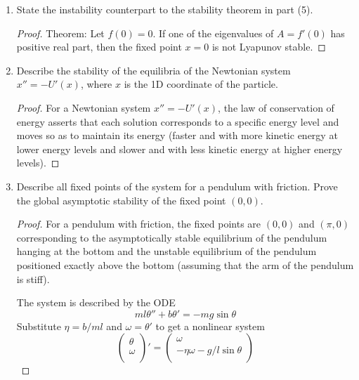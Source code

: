 \documentclass[../psets.tex]{subfiles}
\begin{document}
\begin{enumerate}
\begin{proof}
\begin{proof}
        \end{proof}
    \end{proof}
    \item State the instability counterpart to the stability theorem in part (5).
    \begin{proof}
        Theorem: Let $f(0)=0$. If one of the eigenvalues of $A=f'(0)$ has positive real part, then the fixed point $x=0$ is not Lyapunov stable.
    \end{proof}
    \item Describe the stability of the equilibria of the Newtonian system $x''=-U'(x)$, where $x$ is the 1D coordinate of the particle.
    \begin{proof}
        For a Newtonian system $x''=-U'(x)$, the law of conservation of energy asserts that each solution corresponds to a specific energy level and moves so as to maintain its energy (faster and with more kinetic energy at lower energy levels and slower and with less kinetic energy at higher energy levels).
    \end{proof}
    \item Describe all fixed points of the system for a pendulum with friction. Prove the global asymptotic stability of the fixed point $(0,0)$.
    \begin{proof}
        For a pendulum with friction, the fixed points are $(0,0)$ and $(\pi,0)$ corresponding to the asymptotically stable equilibrium of the pendulum hanging at the bottom and the unstable equilibrium of the pendulum positioned exactly above the bottom (assuming that the arm of the pendulum is stiff).\par
        The system is described by the ODE
        \begin{equation*}
            ml\theta''+b\theta' = -mg\sin\theta
        \end{equation*}
        Substitute $\eta=b/ml$ and $\omega=\theta'$ to get a nonlinear system
        \begin{equation*}
            \begin{pmatrix}
                \theta\\
                \omega\\
            \end{pmatrix}'
            =
            \begin{pmatrix}
                \omega\\
                -\eta\omega-g/l\sin\theta\\
            \end{pmatrix}

\end{equation*}
\end{proof}
\end{enumerate}
\end{document}
